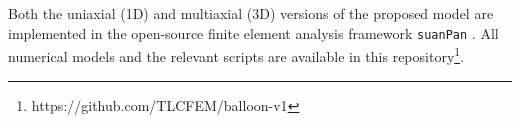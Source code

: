 Both the uniaxial (1D) and multiaxial (3D) versions of the proposed model are implemented in the open-source finite element analysis framework \texttt{suanPan} \citep{Chang2024}.
All numerical models and the relevant scripts are available in this repository\footnote{https://github.com/TLCFEM/balloon-v1}.